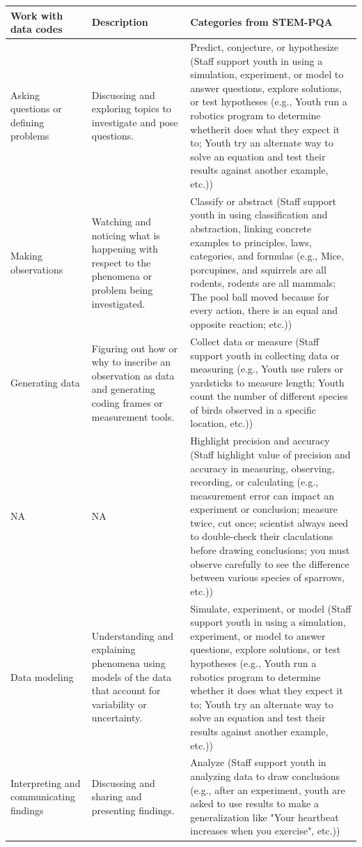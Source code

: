\documentclass[]{book}
\theoremstyle{definition}
\theoremstyle{definition}
\theoremstyle{definition}
\theoremstyle{remark}
\begin{document}
\begin{tabular}{l|l|l}
\hline
Work with data codes & Description & Categories from STEM-PQA\\
\hline
Asking questions or defining problems & Discussing and exploring topics to investigate and pose questions. & Predict, conjecture, or hypothesize (Staff support youth in using a simulation, experiment, or model to answer questions, explore solutions, or test hypotheses (e.g., Youth run a robotics program to determine whetherit does what they expect it to; Youth try an alternate way to solve an equation and test their results against another example, etc.))\\
\hline
Making observations & Watching and noticing what is happening with respect to the phenomena or problem being investigated. & Classify or abstract (Staff support youth in using classification and abstraction, linking concrete examples to principles, laws, categories, and formulas (e.g., Mice, porcupines, and squirrels are all rodents, rodents are all mammals; The pool ball moved because for every action, there is an equal and opposite reaction; etc.))\\
\hline
Generating data & Figuring out how or why to inscribe an observation as data and generating coding frames or measurement tools. & Collect data or measure (Staff support youth in collecting data or measuring (e.g., Youth use rulers or yardsticks to measure length; Youth count the number of different species of birds observed in a specific location, etc.))\\
\hline
NA & NA & Highlight precision and accuracy (Staff highlight value of precision and accuracy in measuring, observing, recording, or calculating (e.g., measurement error can impact an experiment or conclusion; measure twice, cut once; scientist always need to double-check their claculations before drawing conclusions; you must observe carefully to see the difference between various species of sparrows, etc.))\\
\hline
Data modeling & Understanding and explaining phenomena using models of the data that account for variability or uncertainty. & Simulate, experiment, or model (Staff support youth in using a simulation, experiment, or model to answer questions, explore solutions, or test hypotheses (e.g., Youth run a robotics program to determine whether it does what they expect it to; Youth try an alternate way to solve an equation and test their results against another example, etc.))\\
\hline
Interpreting and communicating findings & Discussing and sharing and presenting findings. & Analyze (Staff support youth in analyzing data to draw conclusions (e.g., after an experiment, youth are asked to use results to make a generalization like "Your heartbeat increases when you exercise", etc.))\\
\hline
\end{tabular}
\end{document}
